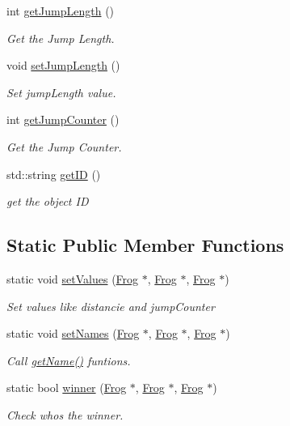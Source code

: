 \begin{DoxyCompactItemize}
int \hyperlink{classFrog_a134ee1af32abd5bf4395c397dd9616ab}{get\+Jump\+Length} ()
\begin{DoxyCompactList}\small\item\em Get the Jump Length. \end{DoxyCompactList}\item 
void \hyperlink{classFrog_a9e70fe0e853bea38df66d615215542fd}{set\+Jump\+Length} ()
\begin{DoxyCompactList}\small\item\em Set jump\+Length value. \end{DoxyCompactList}\item 
int \hyperlink{classFrog_a5bf95a112f8b818391a12a0c378a04c1}{get\+Jump\+Counter} ()
\begin{DoxyCompactList}\small\item\em Get the Jump Counter. \end{DoxyCompactList}\item 
std\+::string \hyperlink{classFrog_aebcea8c3033fc410801afe7a213c5cd8}{get\+ID} ()
\begin{DoxyCompactList}\small\item\em get the object ID \end{DoxyCompactList}\end{DoxyCompactItemize}
\subsection*{Static Public Member Functions}
\begin{DoxyCompactItemize}
\item 
static void \hyperlink{classFrog_a406747ce3a1b90e20a4d73a7c8e271e1}{set\+Values} (\hyperlink{classFrog}{Frog} $\ast$, \hyperlink{classFrog}{Frog} $\ast$, \hyperlink{classFrog}{Frog} $\ast$)
\begin{DoxyCompactList}\small\item\em Set values like {\itshape distancie} and {\itshape jump\+Counter} \end{DoxyCompactList}\item 
static void \hyperlink{classFrog_a9caa1655987b9fd5ee1718eb5d71243d}{set\+Names} (\hyperlink{classFrog}{Frog} $\ast$, \hyperlink{classFrog}{Frog} $\ast$, \hyperlink{classFrog}{Frog} $\ast$)
\begin{DoxyCompactList}\small\item\em Call \hyperlink{classFrog_aed2135d3c87ea38779a103904db1ac01}{get\+Name()} funtions. \end{DoxyCompactList}\item 
static bool \hyperlink{classFrog_aefca49315bbf86bf6c23e71143f43ef3}{winner} (\hyperlink{classFrog}{Frog} $\ast$, \hyperlink{classFrog}{Frog} $\ast$, \hyperlink{classFrog}{Frog} $\ast$)
\begin{DoxyCompactList}\small\item\em Check who\textquotesingle{}s the winner. \end{DoxyCompactList}\end{DoxyCompactItemize}
